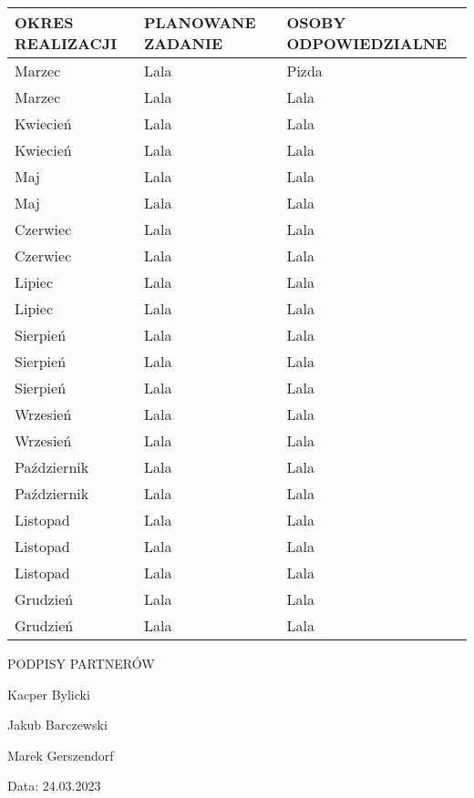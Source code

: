 \documentclass[a4paper, landscape]{article}
\begin{document}
\setlength{\arrayrulewidth}{0.5mm}
\setlength{\tabcolsep}{1.5cm}
\renewcommand{\arraystretch}{1}

\pagestyle{fancy}

\fancyhf{}
\renewcommand{\headrulewidth}{0pt}
\fancyhead{\uniimage}

\vspace*{1cm}

\textbf{\topic}

\begin{center}

\begin{tabular}{ |p{4cm}|p{4.5cm}|p{5cm}|  }
        \hline
    OKRES REALIZACJI & PLANOWANE ZADANIE & OSOBY ODPOWIEDZIALNE \\ \hline
     Marzec & Lala & Pizda\\ \hline
     Marzec & Lala & Lala \\ \hline
     Kwiecień & Lala & Lala \\ \hline
     Kwiecień & Lala & Lala \\ \hline
     Maj & Lala & Lala \\ \hline
     Maj & Lala & Lala \\ \hline
     Czerwiec & Lala & Lala \\ \hline
     Czerwiec & Lala & Lala \\ \hline
     Lipiec & Lala & Lala \\ \hline
     Lipiec & Lala & Lala \\ \hline
     Sierpień & Lala & Lala \\ \hline
     Sierpień & Lala & Lala \\ \hline
     Sierpień & Lala & Lala \\ \hline
     Wrzesień & Lala & Lala \\ \hline
     Wrzesień & Lala & Lala \\ \hline
     Październik & Lala & Lala \\ \hline
     Październik & Lala & Lala \\ \hline
     Listopad & Lala & Lala \\ \hline
     Listopad & Lala & Lala \\ \hline
     Listopad & Lala & Lala \\ \hline
     Grudzień & Lala & Lala \\ \hline
     Grudzień & Lala & Lala \\ \hline
    \end{tabular}
\end{center}

\newpage

\parindent 0cm
\color{BlueViolet}
\MakeUppercase{Podpisy partnerów}

\color{black}
Kacper Bylicki

Jakub Barczewski

Marek Gerszendorf

Data: 24.03.2023
\end{document}
